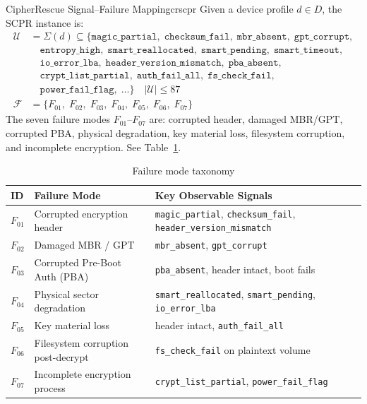 \documentclass[11pt,a4paper]{report}
\newcommand{\calU}{\mathcal{U}}
\newcommand{\calF}{\mathcal{F}}
\begin{document}
\begin{definition}{CipherRescue Signal--Failure Mapping}{crscpr}
Given a device profile $d \in D$, the SCPR instance is:
\begin{align*}
\calU &= \Sigma(d) \subseteq \{\mathtt{magic\_partial},\; \mathtt{checksum\_fail},\; \mathtt{mbr\_absent},\; \mathtt{gpt\_corrupt},\\
&\quad \mathtt{entropy\_high},\; \mathtt{smart\_reallocated},\; \mathtt{smart\_pending},\; \mathtt{smart\_timeout},\\
&\quad \mathtt{io\_error\_lba},\; \mathtt{header\_version\_mismatch},\; \mathtt{pba\_absent},\\
&\quad \mathtt{crypt\_list\_partial},\; \mathtt{auth\_fail\_all},\; \mathtt{fs\_check\_fail},\\
&\quad \mathtt{power\_fail\_flag},\; \ldots\} \quad |\calU| \leq 87 \\[6pt]
\calF &= \{F_{01},\; F_{02},\; F_{03},\; F_{04},\; F_{05},\; F_{06},\; F_{07}\}
\end{align*}
The seven failure modes $F_{01}$--$F_{07}$ are: corrupted header, damaged MBR/GPT, corrupted PBA, physical degradation, key material loss, filesystem corruption, and incomplete encryption. See Table~\ref{tab:failuremodes}.
\end{definition}

\begin{table}[htbp]
\centering
\caption{Failure mode taxonomy}
\label{tab:failuremodes}
\begin{tabular}{@{}lll@{}}
\toprule
\textbf{ID} & \textbf{Failure Mode} & \textbf{Key Observable Signals} \\
\midrule
$F_{01}$ & Corrupted encryption header     & \texttt{magic\_partial}, \texttt{checksum\_fail}, \texttt{header\_version\_mismatch} \\
$F_{02}$ & Damaged MBR / GPT               & \texttt{mbr\_absent}, \texttt{gpt\_corrupt} \\
$F_{03}$ & Corrupted Pre-Boot Auth (PBA)   & \texttt{pba\_absent}, header intact, boot fails \\
$F_{04}$ & Physical sector degradation     & \texttt{smart\_reallocated}, \texttt{smart\_pending}, \texttt{io\_error\_lba} \\
$F_{05}$ & Key material loss               & header intact, \texttt{auth\_fail\_all} \\
$F_{06}$ & Filesystem corruption post-decrypt & \texttt{fs\_check\_fail} on plaintext volume \\
$F_{07}$ & Incomplete encryption process   & \texttt{crypt\_list\_partial}, \texttt{power\_fail\_flag} \\
\bottomrule
\end{tabular}
\end{table}
\end{document}
